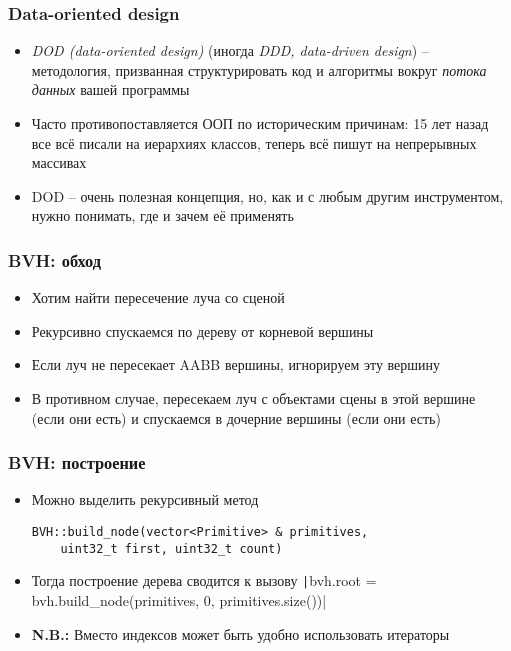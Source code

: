 \documentclass[handout,10pt]{beamer}
\begin{document}
\begin{frame}[fragile]
\frametitle{Data-oriented design}
\begin{itemize}
\item \textit{DOD (data-oriented design)} (иногда \textit{DDD, data-driven design}) -- методология, призванная структурировать код и алгоритмы вокруг \textit{потока данных} вашей программы
\pause
\item Часто противопоставляется ООП по историческим причинам: 15 лет назад все всё писали на иерархиях классов, теперь всё пишут на непрерывных массивах
\pause
\item DOD -- очень полезная концепция, но, как и с любым другим инструментом, нужно понимать, где и зачем её применять
\end{itemize}
\end{frame}

\begin{frame}[fragile]
\frametitle{BVH: обход}
\begin{itemize}
\item Хотим найти пересечение луча со сценой
\pause
\item Рекурсивно спускаемся по дереву от корневой вершины
\pause
\item Если луч не пересекает AABB вершины, игнорируем эту вершину
\pause
\item В противном случае, пересекаем луч с объектами сцены в этой вершине (если они есть) и спускаемся в дочерние вершины (если они есть)
\end{itemize}
\end{frame}

\begin{frame}[fragile]
\frametitle{BVH: построение}
\begin{itemize}
\item Можно выделить рекурсивный метод
\begin{verbatim}
BVH::build_node(vector<Primitive> & primitives,
    uint32_t first, uint32_t count)
\end{verbatim}
\pause
\item Тогда построение дерева сводится к вызову
\texttt|bvh.root = bvh.build_node(primitives, 0, primitives.size())|
\pause
\item \textbf{\alert{N.B.:}} Вместо индексов может быть удобно использовать итераторы
\end{itemize}
\end{frame}
\end{document}
